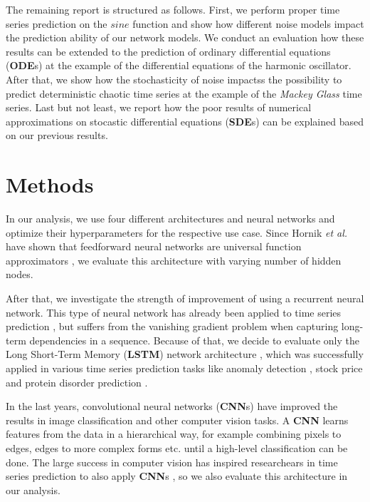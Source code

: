 \documentclass{article}
\begin{document}
The remaining report is structured as follows. First, we perform proper time
series prediction on the $sine$ function and show how different noise models
impact the prediction ability of our network models. We conduct an evaluation
how these results can be extended to the prediction of
ordinary differential equations (\textbf{ODE}s) at the example of the
differential equations of the harmonic oscillator. After that, we show how the
stochasticity of noise impactss the possibility to predict deterministic
chaotic time series at the example of the \emph{Mackey Glass} time series. Last
but not least, we report how the poor results of numerical approximations on
stocastic differential equations (\textbf{SDE}s) can be explained based on our
previous results.

\section{Methods}

In our analysis, we use four different architectures and neural networks and
optimize their hyperparameters for the respective use case. Since Hornik
\textit{et al.} have shown that feedforward neural networks are universal
function approximators \cite{hornik1989}, we evaluate this architecture with
varying number of hidden nodes.

After that, we investigate the strength of
improvement of using a recurrent neural network. This type of neural network has
already been applied to time series prediction \cite{connor1994}, but suffers
from the vanishing gradient problem when capturing long-term dependencies in a
sequence. Because of that, we decide to evaluate only the Long Short-Term Memory
(\textbf{LSTM})
network architecture \cite{hochreiter1997}, which was successfully applied in
various time series prediction tasks like anomaly detection \cite{malhotra2015},
stock price \cite{fischer2018} and protein disorder prediction
\cite{hanson2016}.

In the last years, convolutional neural networks (\textbf{CNN}s) have improved
the results in image classification \cite{krizhevsky2012} and other computer
vision tasks. A \textbf{CNN} learns features from the data in a hierarchical
way, for example combining pixels to edges, edges to more complex forms etc.
until a high-level classification can be done. The large success in computer
vision has inspired researchears in time series prediction to also apply
\textbf{CNN}s \cite{cui2016, borovykh2017}, so we also evaluate this
architecture in our analysis.
\end{document}
